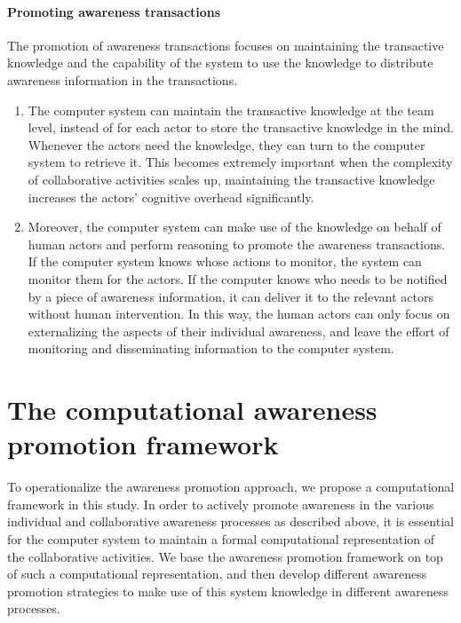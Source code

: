 \paragraph*{Promoting awareness transactions} %
\label{par:promoting_awareness_transactions}
The promotion of awareness transactions focuses on maintaining the transactive knowledge and the capability of the system to use the knowledge to distribute awareness information in the transactions. 
\begin{enumerate}
   \item The computer system can maintain the transactive knowledge at the team level, instead of for each actor to store the transactive knowledge in the mind. Whenever the actors need the knowledge, they can turn to the computer system to retrieve it. This becomes extremely important when the complexity of collaborative activities scales up, maintaining the transactive knowledge increases the actors' cognitive overhead significantly.
   \item Moreover, the computer system can make use of the knowledge on behalf of human actors and perform reasoning to promote the awareness transactions. If the computer system knows whose actions to monitor, the system can monitor them for the actors. If the computer knows who needs to be notified by a piece of awareness information, it can deliver it to the relevant actors without human intervention. In this way, the human actors can only focus on externalizing the aspects of their individual awareness, and leave the effort of monitoring and disseminating information to the computer system.
\end{enumerate}

\section{The computational awareness promotion framework} %
\label{sec:the_awareness_promotion_framework}
To operationalize the awareness promotion approach, we propose a computational framework in this study. In order to actively promote awareness in the various individual and collaborative awareness processes as described above, it is essential for the computer system to maintain a formal computational representation of the collaborative activities. We base the awareness promotion framework on top of such a computational representation, and then develop different awareness promotion strategies to make use of this system knowledge in different awareness processes. 

